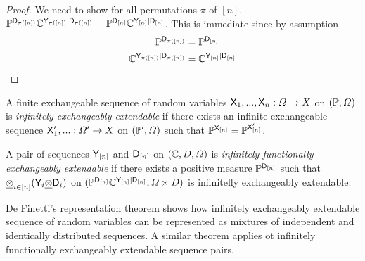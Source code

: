 \begin{proof}
We need to show for all permutations $\pi$ of $[n]$, $\mathbb{P}^{\mathsf{D}_{\pi([n])}}\mathbb{C}^{\mathsf{Y}_{\pi([n])}|\mathsf{D}_{\pi([n])}}=\mathbb{P}^{\mathsf{D}_{[n]}}\mathbb{C}^{\mathsf{Y}_{[n]}|\mathsf{D}_{[n]}}$. This is immediate since by assumption
\begin{align}
    \mathbb{P}^{\mathsf{D}_{\pi([n])}} &= \mathbb{P}^{\mathsf{D}_{[n]}}\\
    \mathbb{C}^{\mathsf{Y}_{\pi([n])}|\mathsf{D}_{\pi([n])}}&=\mathbb{C}^{\mathsf{Y}_{[n]}|\mathsf{D}_{[n]}}
\end{align}
\end{proof}

\begin{definition}
A finite exchangeable sequence of random variables $\mathsf{X}_1,...,\mathsf{X}_n:\Omega\to X$ on $(\mathbb{P},\Omega)$ is \emph{infinitely exchangeably extendable} if there exists an infinite exchangeable sequence $\mathsf{X}'_1,...:\Omega'\to X$ on $(\mathbb{P}',\Omega)$ such that $\mathbb{P}^{\mathsf{X}_{[n]}}=\mathbb{P}^{\mathsf{X}'_{[n]}}$.
\end{definition}

\begin{definition}
A pair of sequences $\mathsf{Y}_{[n]}$ and $\mathsf{D}_{[n]}$ on $(\mathbb{C},D,\Omega)$ is \emph{infinitely functionally exchangeably extendable} if there exists a positive measure $\mathbb{P}^{\mathsf{D}_{[n]}}$ such that $\underline{\otimes}_{i\in[n]}(\mathsf{Y}_i\underline{\otimes}\mathsf{D}_i)$ on $(\mathbb{P}^{\mathsf{D}_{[n]}}\mathbb{C}^{\mathsf{Y}_{[n]}|\mathsf{D}_{[n]}},\Omega\times D)$ is infinitelly exchangeably extendable.
\end{definition}


De Finetti's representation theorem shows how infinitely exchangeably extendable sequence of random variables can be represented as mixtures of independent and identically distributed sequences. A similar theorem applies ot infinitely functionally exchangeably extendable sequence pairs.